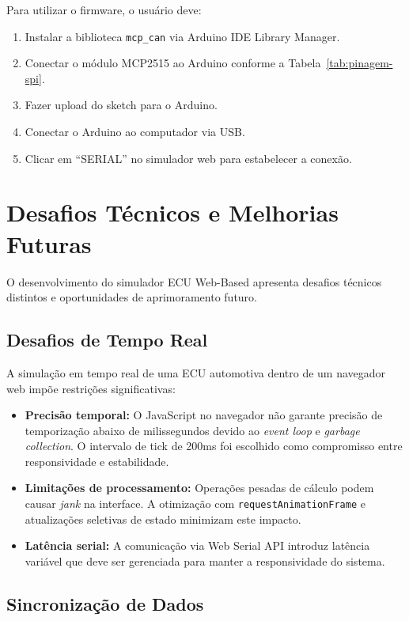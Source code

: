 Para utilizar o firmware, o usuário deve:
\begin{enumerate}
    \item Instalar a biblioteca \texttt{mcp\_can} via Arduino IDE Library Manager.
    \item Conectar o módulo MCP2515 ao Arduino conforme a Tabela~\ref{tab:pinagem-spi}.
    \item Fazer upload do sketch para o Arduino.
    \item Conectar o Arduino ao computador via USB.
    \item Clicar em ``SERIAL'' no simulador web para estabelecer a conexão.
\end{enumerate}

\section{Desafios Técnicos e Melhorias Futuras}
\label{sec:desafios}

O desenvolvimento do simulador ECU Web-Based apresenta desafios técnicos distintos e oportunidades de aprimoramento futuro.

\subsection{Desafios de Tempo Real}

A simulação em tempo real de uma ECU automotiva dentro de um navegador web impõe restrições significativas:

\begin{itemize}
    \item \textbf{Precisão temporal:} O JavaScript no navegador não garante precisão de temporização abaixo de milissegundos devido ao \textit{event loop} e \textit{garbage collection}. O intervalo de tick de 200ms foi escolhido como compromisso entre responsividade e estabilidade.
    \item \textbf{Limitações de processamento:} Operações pesadas de cálculo podem causar \textit{jank} na interface. A otimização com \texttt{requestAnimationFrame} e atualizações seletivas de estado minimizam este impacto.
    \item \textbf{Latência serial:} A comunicação via Web Serial API introduz latência variável que deve ser gerenciada para manter a responsividade do sistema.
\end{itemize}

\subsection{Sincronização de Dados}


